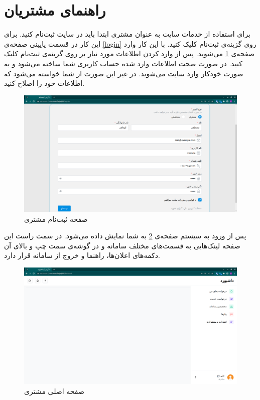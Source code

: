 \FloatBarrier
\section{راهنمای مشتریان}

برای استفاده از خدمات سایت به عنوان مشتری ابتدا باید در سایت ثبت‌نام کنید. برای این کار در قسمت پایینی صفحه‌ی \ref{login} روی گزینه‌ی ثبت‌نام کلیک کنید.
با این کار وارد صفحه‌ی \ref{customer-signup} می‌شوید. پس از وارد کردن اطلاعات مورد نیاز بر روی گزینه‌ی ثبت‌نام کلیک کنید.
در صورت صحت اطلاعات وارد شده حساب کاربری شما ساخته می‌شود و به صورت خودکار وارد سایت می‌شوید.
در غیر این صورت از شما خواسته می‌شود که اطلاعات خود را اصلاح کنید.

\begin{figure}[h]
	\centering
	\includegraphics[width=\textwidth]{figs/user-guide/customer-signup}
	\caption{صفحه ثبت‌نام مشتری}
	\label{customer-signup}
\end{figure}

پس از ورود به سیستم صفحه‌ی \ref{customer-dashboard} به شما نمایش داده می‌شود.
در سمت راست این صفحه لینک‌هایی به قسمت‌های مختلف سامانه و در گوشه‌ی سمت چپ و بالای آن دکمه‌های اعلان‌ها، راهنما و خروج از سامانه قرار دارد.

\begin{figure}[h]
	\centering
	\includegraphics[width=\textwidth]{figs/user-guide/customer-dashboard}
	\caption{صفحه اصلی مشتری}
	\label{customer-dashboard}
\end{figure}

